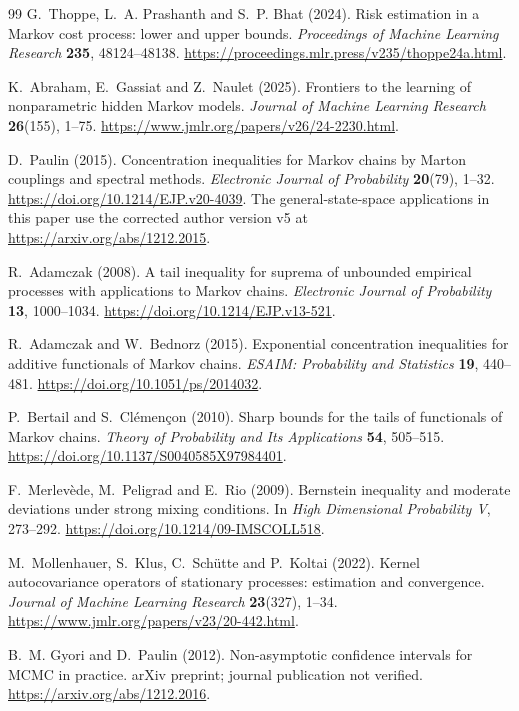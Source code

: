 \documentclass[11pt]{article}
\theoremstyle{definition}
\theoremstyle{remark}
\begin{document}
\begin{thebibliography}{99}
G.~Thoppe, L.~A. Prashanth and S.~P. Bhat (2024).
Risk estimation in a Markov cost process: lower and upper bounds.
\emph{Proceedings of Machine Learning Research} \textbf{235}, 48124--48138.
\url{https://proceedings.mlr.press/v235/thoppe24a.html}.

K.~Abraham, E.~Gassiat and Z.~Naulet (2025).
Frontiers to the learning of nonparametric hidden Markov models.
\emph{Journal of Machine Learning Research} \textbf{26}(155), 1--75.
\url{https://www.jmlr.org/papers/v26/24-2230.html}.

D.~Paulin (2015).
Concentration inequalities for Markov chains by Marton couplings and
spectral methods.
\emph{Electronic Journal of Probability} \textbf{20}(79), 1--32.
\url{https://doi.org/10.1214/EJP.v20-4039}.
The general-state-space applications in this paper use the corrected author
version v5 at \url{https://arxiv.org/abs/1212.2015}.

R.~Adamczak (2008).
A tail inequality for suprema of unbounded empirical processes with
applications to Markov chains.
\emph{Electronic Journal of Probability} \textbf{13}, 1000--1034.
\url{https://doi.org/10.1214/EJP.v13-521}.

R.~Adamczak and W.~Bednorz (2015).
Exponential concentration inequalities for additive functionals of Markov
chains.
\emph{ESAIM: Probability and Statistics} \textbf{19}, 440--481.
\url{https://doi.org/10.1051/ps/2014032}.

P.~Bertail and S.~Cl\'emen\c{c}on (2010).
Sharp bounds for the tails of functionals of Markov chains.
\emph{Theory of Probability and Its Applications} \textbf{54}, 505--515.
\url{https://doi.org/10.1137/S0040585X97984401}.

F.~Merlev\`ede, M.~Peligrad and E.~Rio (2009).
Bernstein inequality and moderate deviations under strong mixing conditions.
In \emph{High Dimensional Probability V}, 273--292.
\url{https://doi.org/10.1214/09-IMSCOLL518}.

M.~Mollenhauer, S.~Klus, C.~Sch\"utte and P.~Koltai (2022).
Kernel autocovariance operators of stationary processes: estimation and
convergence.
\emph{Journal of Machine Learning Research} \textbf{23}(327), 1--34.
\url{https://www.jmlr.org/papers/v23/20-442.html}.

B.~M. Gyori and D.~Paulin (2012).
Non-asymptotic confidence intervals for MCMC in practice.
arXiv preprint; journal publication not verified.
\url{https://arxiv.org/abs/1212.2016}.


\end{thebibliography}
\end{document}
